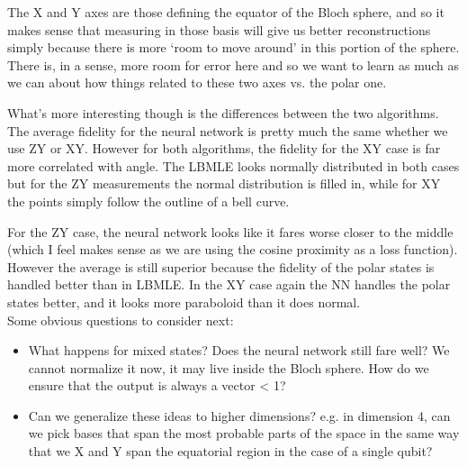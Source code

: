 \documentclass[a4paper,10pt]{article}
\begin{document}
 The X and Y axes are those defining the equator of the Bloch sphere, and so it makes sense that measuring in those basis will give us better reconstructions simply because there is more `room to move around' in this portion of the sphere. There is, in a sense, more room for error here and so we want to learn as much as we can about how things related to these two axes vs. the polar one. 
 
 What's more interesting though is the differences between the two algorithms. The average fidelity for the neural network is pretty much the same whether we use ZY or XY. However for both algorithms, the fidelity for the XY case is far more correlated with angle. The LBMLE looks normally distributed in both cases but for the ZY measurements the normal distribution is filled in, while for XY the points simply follow the outline of a bell curve. 
 
 For the ZY case, the neural network looks like it fares worse closer to the middle (which I feel makes sense as we are using the cosine proximity as a loss function). However the average is still superior because the fidelity of the polar states is handled better than in LBMLE. In the XY case again the NN handles the polar states better, and it looks more paraboloid than it does normal. \\
 
 Some obvious questions to consider next:
 \begin{itemize}
  \item What happens for mixed states? Does the neural network still fare well? We cannot normalize it now, it may live inside the Bloch sphere. How do we ensure that the output is always a vector < 1?
  \item Can we generalize these ideas to higher dimensions? e.g. in dimension 4, can we pick bases that span the most probable parts of the space in the same way that we X and Y span the equatorial region in the case of a single qubit?
 \end{itemize}
 
\end{document}
